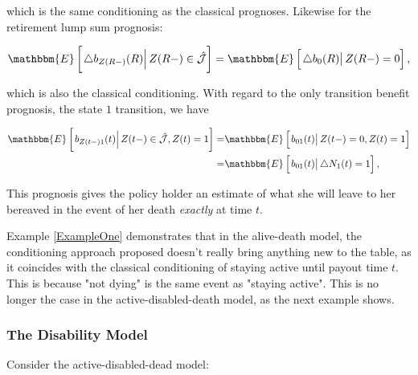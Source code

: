 \documentclass{article}
\newcommand{\1}[1]{\mathbbm{1}_{\left\lbrace #1 \right\rbrace}}
\newcommand{\econd}[2][def]{\mathbbm{E} \left[ \left. #1 \right| #2 \right]}
\theoremstyle{break}
\theoremstyle{remark}
\numberwithin{equation}{section}
\begin{document}
which is the same conditioning as the classical prognoses. Likewise for the retirement lump sum prognosis:

\begin{align*}
    \econd[\triangle b_{Z(R-)}(R)]{Z(R-) \in \hat{\mathcal{J}}} = \econd[\triangle b_0(R)]{Z(R-) = 0},
\end{align*}

which is also the classical conditioning. With regard to the only transition benefit prognosis, the state $1$ transition, we have

\begin{align*}
\econd[b_{Z(t-)1}(t)]{Z(t-) \in \hat{\mathcal{J}}, Z(t)=1} =& \econd[b_{01}(t)]{Z(t-)=0, Z(t)=1} \\
=& \econd[b_{01}(t)]{\triangle N_1(t) = 1},
\end{align*}

This prognosis gives the policy holder an estimate of what she will leave to her bereaved in the event of her death \textit{exactly} at time $t$.

Example \ref{ExampleOne} demonstrates that in the alive-death model, the conditioning approach proposed doesn't really bring anything new to the table, as it coincides with the classical conditioning of staying active until payout time $t$. This is because "not dying" is the same event as "staying active". This is no longer the case in the active-disabled-death model, as the next example shows.

\subsubsection{The Disability Model} \label{DisModel}

Consider the active-disabled-dead model:
\end{document}
